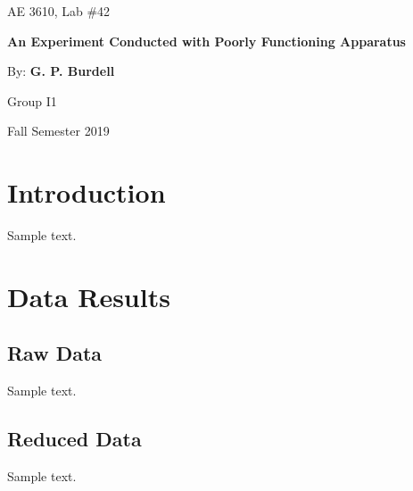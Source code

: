 \documentclass[12pt]{article} %
\begin{document}
\selectfont %

\begin{titlepage}
    \begin{center}
        \large

        \vspace*{1.5in}
        AE 3610, Lab \#42

        \vspace{1.5in}
        \textbf{An Experiment Conducted with Poorly Functioning Apparatus}

        \vspace{0.5in}
        By: \textbf{G. P. Burdell}

        \vspace{2in}
        Group I1

        \vspace{0.5in}
        Fall Semester 2019
    \end{center}
\end{titlepage}
\section*{Introduction}
Sample text.
\section*{Data Results}
\subsection*{Raw Data}
Sample text.
\subsection*{Reduced Data}
Sample text.
\end{document}
